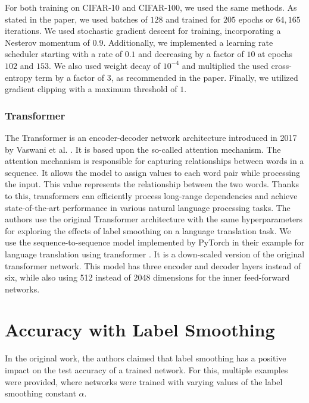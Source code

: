 For both training on CIFAR-10 and CIFAR-100, we used the same methods. As stated in the paper, we used batches of $128$ and trained for $205$ epochs or $64,165$ iterations. We used stochastic gradient descent for training, incorporating a Nesterov momentum of $0.9$. Additionally, we implemented a learning rate scheduler starting with a rate of $0.1$ and decreasing by a factor of $10$ at epochs $102$ and $153$. We also used weight decay of $10^{-4}$ and multiplied the used cross-entropy term by a factor of $3$, as recommended in the paper. Finally, we utilized gradient clipping with a maximum threshold of $1$.

\subsubsection{Transformer}\label{transformer_model}
The Transformer is an encoder-decoder network architecture introduced in 2017 by Vaswani et al. \cite{vaswani2017}. It is based upon the so-called attention mechanism. The attention mechanism is responsible for capturing relationships between words in a sequence. It allows the model to assign values to each word pair while processing the input. This value represents the relationship between the two words. Thanks to this, transformers can efficiently process long-range dependencies and achieve state-of-the-art performance in various natural language processing tasks.
The authors use the original Transformer architecture \cite{vaswani2017} with the same hyperparameters for exploring the effects of label smoothing on a language translation task. We use the sequence-to-sequence model implemented by PyTorch in their example for language translation using transformer \cite{transformerTutorial}. It is a down-scaled version of the original transformer network. This model has three encoder and decoder layers instead of six, while also using 512 instead of 2048 dimensions for the inner feed-forward networks.

\section{Accuracy with Label Smoothing}\label{sec:acc}
In the original work, the authors claimed that label smoothing has a positive impact on the test accuracy of a trained network. For this, multiple examples were provided, where networks were trained with varying values of the label smoothing constant $\alpha$.

